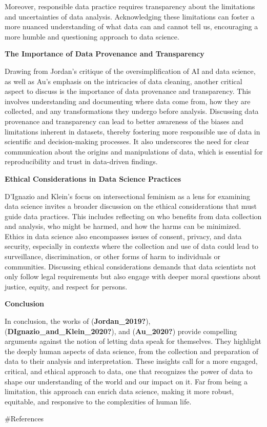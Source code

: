 \documentclass[
  letterpaper,
  DIV=11,
  numbers=noendperiod]{scrartcl}
\begin{document}
Moreover, responsible data practice requires transparency about the
limitations and uncertainties of data analysis. Acknowledging these
limitations can foster a more nuanced understanding of what data can and
cannot tell us, encouraging a more humble and questioning approach to
data science.

\textbf{The Importance of Data Provenance and Transparency}

Drawing from Jordan's critique of the oversimplification of AI and data
science, as well as Au's emphasis on the intricacies of data cleaning,
another critical aspect to discuss is the importance of data provenance
and transparency. This involves understanding and documenting where data
come from, how they are collected, and any transformations they undergo
before analysis. Discussing data provenance and transparency can lead to
better awareness of the biases and limitations inherent in datasets,
thereby fostering more responsible use of data in scientific and
decision-making processes. It also underscores the need for clear
communication about the origins and manipulations of data, which is
essential for reproducibility and trust in data-driven findings.

\textbf{Ethical Considerations in Data Science Practices}

D'Ignazio and Klein's focus on intersectional feminism as a lens for
examining data science invites a broader discussion on the ethical
considerations that must guide data practices. This includes reflecting
on who benefits from data collection and analysis, who might be harmed,
and how the harms can be minimized. Ethics in data science also
encompasses issues of consent, privacy, and data security, especially in
contexts where the collection and use of data could lead to
surveillance, discrimination, or other forms of harm to individuals or
communities. Discussing ethical considerations demands that data
scientists not only follow legal requirements but also engage with
deeper moral questions about justice, equity, and respect for persons.

\textbf{Conclusion}

In conclusion, the works of (\textbf{Jordan\_2019?}),
(\textbf{DIgnazio\_and\_Klein\_2020?}), and (\textbf{Au\_2020?}) provide
compelling arguments against the notion of letting data speak for
themselves. They highlight the deeply human aspects of data science,
from the collection and preparation of data to their analysis and
interpretation. These insights call for a more engaged, critical, and
ethical approach to data, one that recognizes the power of data to shape
our understanding of the world and our impact on it. Far from being a
limitation, this approach can enrich data science, making it more
robust, equitable, and responsive to the complexities of human life.

\newpage

\#References
\end{document}

